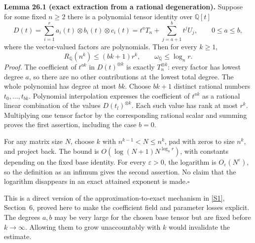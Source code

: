 \documentclass[11pt,a4paper]{article}
\newcommand{\Q}{\mathbb{Q}}
\newcommand{\sref}[2]{\hyperlink{source:#1:#2}{[S#2]}}
\numberwithin{equation}{section}
\begin{document}
\textbf{Lemma 26.1 (exact extraction from a rational degeneration).}
Suppose for some fixed $n\ge2$ there is a polynomial tensor identity over
$\Q[t]$
\begin{equation}\label{r26:degeneration}
 D(t)=\sum_{i=1}^{r}a_i(t)\otimes b_i(t)\otimes c_i(t)
          =t^aT_n+\sum_{j=a+1}^{b}t^jU_j,
          \qquad 0\le a\le b,
\end{equation}
where the vector-valued factors are polynomials. Then for every $k\ge1$,
\begin{equation}\label{r26:exact}
       R_{\Q}(n^k)\le(bk+1)r^k,
       \qquad \omega_{\Q}\le\log_n r.
\end{equation}
\emph{Proof.} The coefficient of $t^{ak}$ in $D(t)^{\otimes k}$ is
exactly $T_n^{\otimes k}$: every factor has lowest degree $a$, so there
are no other contributions at the lowest total degree. The whole
polynomial has degree at most $bk$. Choose $bk+1$ distinct rational
numbers $t_0,\ldots,t_{bk}$. Polynomial interpolation expresses the
coefficient of $t^{ak}$ as a rational linear combination of the values
$D(t_l)^{\otimes k}$. Each such value has rank at most $r^k$.
Multiplying one tensor factor by the corresponding rational scalar and
summing proves the first assertion, including the case $b=0$.

For any matrix size $N$, choose $k$ with $n^{k-1}<N\le n^k$, pad with
zeros to size $n^k$, and project back. The bound is
$O(\log(N+1)N^{\log_n r})$, with constants depending on the fixed base
identity. For every $\varepsilon>0$, the logarithm is
$O_\varepsilon(N^\varepsilon)$, so the definition as an infimum gives
the second assertion. No claim that the logarithm disappears in an
exact attained exponent is made.\hfill$\square$

This is a direct version of the approximation-to-exact mechanism in
\sref{3100086}{1}, Section~6, proved here to make the coefficient field and
parameter losses explicit. The degrees $a,b$ may be very large for the
chosen base tensor but are fixed before $k\to\infty$. Allowing them to
grow unaccountably with $k$ would invalidate the estimate.
\end{document}
